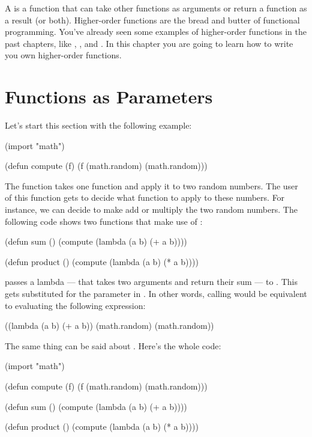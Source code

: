 A  is a function that can take other functions as arguments or return a function as a result (or both). Higher-order functions are the bread and butter of functional programming. You've already seen some examples of higher-order functions in the past chapters, like , , and . In this chapter you are going to learn how to write you own higher-order functions.

\section{Functions as Parameters}
Let's start this section with the following example:

\begin{Meruem}
(import "math")

(defun compute (f) 
  (f (math.random) (math.random)))
\end{Meruem}

The  function takes one function and apply it to two random numbers. The user of this function gets to decide what function to apply to these numbers. For instance, we can decide to make  add or multiply the two random numbers. The following code shows two functions that make use of :

\begin{Meruem}
(defun sum ()
  (compute (lambda (a b) (+ a b))))
  
(defun product ()
  (compute (lambda (a b) (* a b))))
\end{Meruem}

 passes a lambda --- that takes two arguments and return their sum --- to . This gets substituted for the parameter  in . In other words, calling  would be equivalent to evaluating the following expression:

\begin{REPL}
((lambda (a b) (+ a b)) 
	(math.random) (math.random))
\end{REPL}

The same thing can be said about . Here's the whole code:
\begin{Meruem}
(import "math")

(defun compute (f) 
  (f (math.random) (math.random)))

(defun sum ()
  (compute (lambda (a b) (+ a b))))

(defun product ()
  (compute (lambda (a b) (* a b))))
\end{Meruem}

